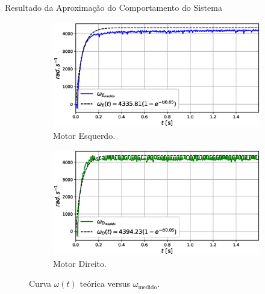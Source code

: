 \begin{frame}{Resultado da Aproximação do Comportamento do Sistema}


\begin{figure}
    \begin{subfigure}{.45\textwidth}
        \centering
        \includegraphics[width=\textwidth]{figuras/resultados/exp03/regressao_vs_medido_esquerdo100.eps}
        \caption{Motor Esquerdo.}
    \end{subfigure}
    \begin{subfigure}{.45\textwidth}
        \centering
        \includegraphics[width=\textwidth]{figuras/resultados/exp03/regressao_vs_medido_direito100.eps}
        \caption{Motor Direito.}
    \end{subfigure}
    \caption{Curva $\omega(t)$ teórica versus $\omega_{\text{medido}}$.}
\end{figure}
    
\end{frame}


